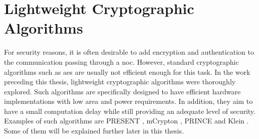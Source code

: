 \section{Lightweight Cryptographic Algorithms}\label{sec:lightweightcrypto}
For security reasons, it is often desirable to add encryption and authentication to the communication passing through a \gls{noc}. However,
standard cryptographic algorithms such as \gls{aes} are usually not efficient enough for this task. \cite[1]{bogdanov07present}
In the work preceding this thesis, lightweight cryptographic algorithms were thoroughly explored. \cite{harttung17lightweightcrypto} Such
algorithms are
specifically designed to have efficient hardware implementations with low area and power requirements. In addition, they aim to have a small
computation delay while still providing an adequate level of security. Examples of such algorithms are PRESENT \cite{bogdanov07present},
mCrypton \cite{lim06mcrypton}, PRINCE \cite{borghoff12prince} and Klein \cite{gong12klein}. Some of them will be explained further later in this
thesis. %

